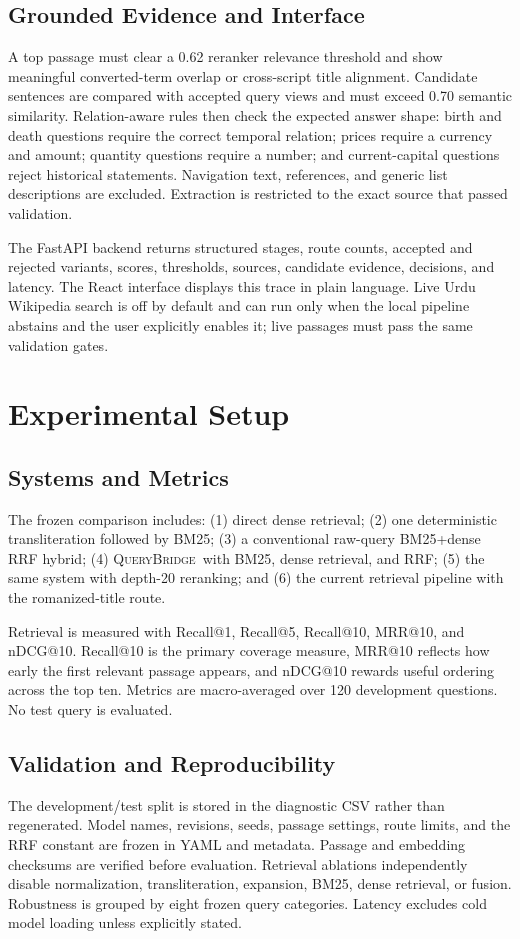 \documentclass[conference]{IEEEtran}
\newcommand{\querybridge}{\textsc{QueryBridge}}
\begin{document}
\subsection{Grounded Evidence and Interface}
A top passage must clear a 0.62 reranker relevance threshold and show meaningful converted-term overlap or cross-script title alignment. Candidate sentences are compared with accepted query views and must exceed 0.70 semantic similarity. Relation-aware rules then check the expected answer shape: birth and death questions require the correct temporal relation; prices require a currency and amount; quantity questions require a number; and current-capital questions reject historical statements. Navigation text, references, and generic list descriptions are excluded. Extraction is restricted to the exact source that passed validation.

The FastAPI backend \cite{fastapi} returns structured stages, route counts, accepted and rejected variants, scores, thresholds, sources, candidate evidence, decisions, and latency. The React interface \cite{react} displays this trace in plain language. Live Urdu Wikipedia search is off by default and can run only when the local pipeline abstains and the user explicitly enables it; live passages must pass the same validation gates.

\section{Experimental Setup}
\subsection{Systems and Metrics}
The frozen comparison includes: (1) direct dense retrieval; (2) one deterministic transliteration followed by BM25; (3) a conventional raw-query BM25+dense RRF hybrid; (4) \querybridge\ with BM25, dense retrieval, and RRF; (5) the same system with depth-20 reranking; and (6) the current retrieval pipeline with the romanized-title route.

Retrieval is measured with Recall@1, Recall@5, Recall@10, MRR@10, and nDCG@10. Recall@10 is the primary coverage measure, MRR@10 reflects how early the first relevant passage appears, and nDCG@10 rewards useful ordering across the top ten. Metrics are macro-averaged over 120 development questions. No test query is evaluated.

\subsection{Validation and Reproducibility}
The development/test split is stored in the diagnostic CSV rather than regenerated. Model names, revisions, seeds, passage settings, route limits, and the RRF constant are frozen in YAML and metadata. Passage and embedding checksums are verified before evaluation. Retrieval ablations independently disable normalization, transliteration, expansion, BM25, dense retrieval, or fusion. Robustness is grouped by eight frozen query categories. Latency excludes cold model loading unless explicitly stated.
\end{document}
